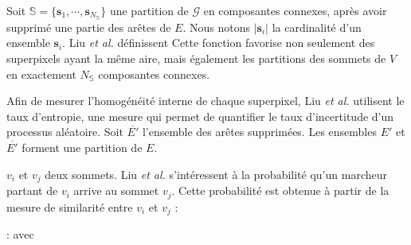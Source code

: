 Soit $\mathbb{S}=\lbrace \mathbf{s}_{1}, \cdots, \mathbf{s}_{N_{\mathbb{S}}} \rbrace$ une partition de $\mathcal{G}$ en composantes connexes, après avoir supprimé une partie des arêtes de $E$. Nous notons $|\mathbf{s}_{i}|$ la cardinalité d'un ensemble $\mathbf{s}_{i}$. Liu \textit{et al.} \cite{liu2011entropy} définissent
Cette fonction favorise non seulement des superpixels ayant la même aire, mais également les partitions des sommets de $V$ en exactement $N_{\mathbb{S}}$ composantes connexes.

Afin de mesurer l’homogénéité interne de chaque superpixel, Liu \textit{et al.} \cite{liu2011entropy} utilisent le taux d'entropie, une mesure qui permet de quantifier le  taux d'incertitude d'un processus aléatoire. Soit $\overline{E'}$ l'ensemble des arêtes supprimées. Les ensembles $E'$ et  $\overline{E'}$ forment une partition de $E$. 

 $v_{i}$ et $v_{j}$ deux sommets.  Liu \textit{et al.} \cite{liu2011entropy} s'intéressent à la probabilité  qu'un marcheur partant de $v_{i}$ arrive au sommet $v_{j}$. Cette probabilité est obtenue à partir de la mesure de similarité entre $v_{i}$ et $v_{j}$ :

 :
avec 

